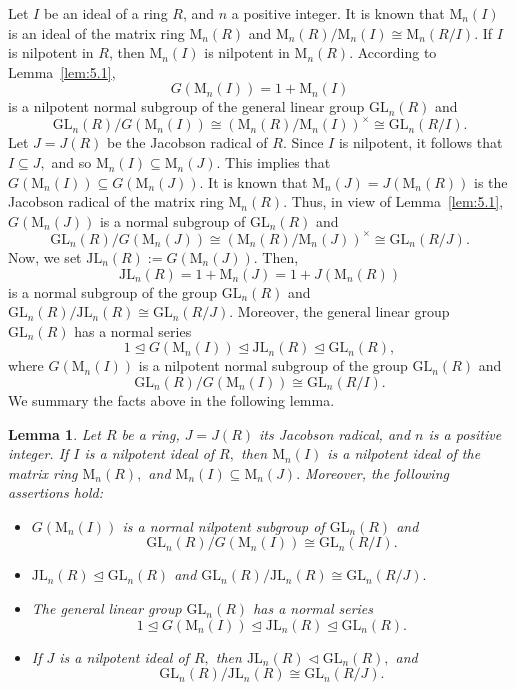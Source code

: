 \documentclass{amsart}
\newtheorem{lemma}[theorem]{Lemma}
\theoremstyle{definition}
\begin{document}
Let $I$ be an ideal of a ring $R$, and $n$ a positive integer. It is known that $\mathrm{M}_n(I)$ is an ideal of the matrix ring $\mathrm{M}_n(R)$ and $\mathrm{M}_n(R)/\mathrm{M}_n(I)\cong\mathrm{M}_n(R/I).$ If $I$ is nilpotent in $R$, then $\mathrm{M}_n(I)$ is nilpotent in $\mathrm{M}_n(R).$ According to Lemma~\ref{lem:5.1}, $$G(\mathrm{M}_n(I))=1+\mathrm{M}_n(I)$$ is a  nilpotent normal subgroup of the general linear group $\mathrm{GL}_n(R)$ and $$\mathrm{GL}_n(R)/G(\mathrm{M}_n(I))\cong (\mathrm{M}_n(R)/\mathrm{M}_n(I))^\times\cong \mathrm{GL}_n(R/I).$$ Let $J=J(R)$ be the Jacobson radical of $R.$ Since $I$ is nilpotent, it follows that $I\subseteq J,$ and so $\mathrm{M}_n(I)\subseteq \mathrm{M}_n(J).$ This implies that $G(\mathrm{M}_n(I))\subseteq G(\mathrm{M}_n(J)).$ It is known that $\mathrm{M}_n(J)=J(\mathrm{M}_n(R))$ is the Jacobson radical of the matrix ring $\mathrm{M}_n(R).$ Thus, in view of Lemma~\ref{lem:5.1}, $G(\mathrm{M}_n(J))$ is a normal subgroup of $\mathrm{GL}_n(R)$ and $$\mathrm{GL}_n(R)/G(\mathrm{M}_n(J))\cong (\mathrm{M}_n(R)/\mathrm{M}_n(J))^\times\cong \mathrm{GL}_n(R/J).$$ Now, we set $\mathrm{JL}_n(R):=G(\mathrm{M}_n(J)).$ Then,  $$\mathrm{JL}_n(R)=1+\mathrm{M}_n(J)=1+J(\mathrm{M}_n(R))$$ is a normal subgroup of the group $\mathrm{GL}_n(R)$ and $\mathrm{GL}_n(R)/\mathrm{JL}_n(R)\cong \mathrm{GL}_n(R/J).$ Moreover, the general linear group $\mathrm{GL}_n(R)$ has a normal series $$1\trianglelefteq G(\mathrm{M}_n(I))\trianglelefteq \mathrm{JL}_n(R)\trianglelefteq \mathrm{GL}_n(R),$$ where $G(\mathrm{M}_n(I))$ is a  nilpotent normal subgroup of the group $\mathrm{GL}_n(R)$ and $$\mathrm{GL}_n(R)/G(\mathrm{M}_n(I))\cong \mathrm{GL}_n(R/I).$$ 
We summary the facts above in the following lemma.
\begin{lemma}\label{lem:5.2} Let $R$ be a ring, $J=J(R)$ its Jacobson radical, and $n$ is a positive integer. If $I$ is a nilpotent ideal of $R,$ then $\mathrm{M}_n(I)$ is a nilpotent ideal of the matrix ring $\mathrm{M}_n(R),$  and  $\mathrm{M}_n(I)\subseteq \mathrm{M}_n(J).$ Moreover, the following assertions hold:
\begin{itemize}
\item [(1)] $G(\mathrm{M}_n(I))$ is a normal nilpotent subgroup of $\mathrm{GL}_n(R)$ and $$\mathrm{GL}_n(R)/G(\mathrm{M}_n(I))\cong \mathrm{GL}_n(R/I).$$
\item [(2)] $\mathrm{JL}_n(R)\trianglelefteq\mathrm{GL}_n(R)$ and $\mathrm{GL}_n(R)/\mathrm{JL}_n(R)\cong \mathrm{GL}_n(R/J).$
\item [(3)] The general linear group $\mathrm{GL}_n(R)$ has a normal series $$1\trianglelefteq G(\mathrm{M}_n(I))\trianglelefteq \mathrm{JL}_n(R)\trianglelefteq \mathrm{GL}_n(R).$$
\item [(4)] If $J$ is a nilpotent ideal of $R,$ then $\mathrm{JL}_n(R)\triangleleft\mathrm{GL}_n(R),$ and $$\mathrm{GL}_n(R)/\mathrm{JL}_n(R)\cong\mathrm{GL}_n(R/J).$$
\end{itemize}
\end{lemma}
\end{document}
